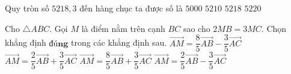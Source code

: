 \begin{ex}%
	Quy tròn số $5218{,}3$ đến hàng chục ta được số là
	\choice
	{$5000$}
	{$5210$}
	{$5218$}
	{\True $5220$}
\end{ex}
\begin{ex}%
	Cho $\triangle ABC$. Gọi $M$ là điểm nằm trên cạnh $BC$ sao cho $2MB=3MC$. Chọn khẳng định  $\textbf{đúng}$ trong các khẳng định sau.
	\choice
	{$\overrightarrow{A M}=\dfrac 85\overrightarrow{A B}-\dfrac 35\overrightarrow{A C}$}
	{\True $\overrightarrow{A M}=\dfrac 25\overrightarrow{A B}+\dfrac 35\overrightarrow{A C}$}
	{$\overrightarrow{A M}=\dfrac 85\overrightarrow{A B}+\dfrac 35\overrightarrow{A C}$}
	{$\overrightarrow{A M}=\dfrac 25\overrightarrow{A B}-\dfrac 35\overrightarrow{A C}$}
\end{ex}

